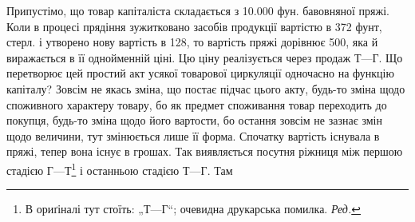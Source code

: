 Припустімо, що товар капіталіста складається з \num{10.000} фун. бавовняної
пряжі. Коли в процесі прядіння зужитковано засобів продукції вартістю
в 372 фунт, стерл. і утворено нову вартість в 128, то вартість
пряжі дорівнює 500, яка й виражається в її однойменній ціні.
Цю ціну реалізується через продаж $Т — Г$. Що перетворює цей простий
акт усякої товарової циркуляції одночасно на функцію капіталу? Зовсім
не якась зміна, що постає підчас цього акту, будь-то зміна щодо споживного
характеру товару, бо як предмет споживання товар переходить до покупця,
будь-то зміна щодо його вартости, бо остання зовсім не зазнає змін
щодо величини, тут змінюється лише її форма. Спочатку вартість існувала
в пряжі, тепер вона існує в грошах. Так виявляється посутня
ріжниця між першою стадією $Г — Т$\footnote*{
В ориґіналі тут стоїть: „$Т — Г$“; очевидна друкарська помилка. \emph{Ред.}
} і останньою стадією $Т — Г$. Там
\parbreak{}  %
